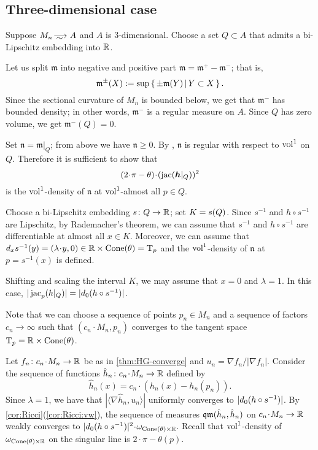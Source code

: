 \subsection{Three-dimensional case}


Suppose $M_n\smooths{}A$ and $A$ is 3-dimensional.
Choose a set $Q\subset A$ that admits a bi-Lipschitz embedding into $\mathbb{R}$. 

Let us split $\mathfrak m$ into negative and positive part $\mathfrak m=\mathfrak m^+-\mathfrak m^-$; that is,
\[\mathfrak m^\pm(X)\mathrel{{:}{=}}\sup\left\{\,\pm\mathfrak m(Y)\,\middle|\,Y\subset X\,\right\}.\]
Since the sectional curvature of $M_n$ is bounded below, we get that $\mathfrak m^-$ has bounded density; in other words, $\mathfrak m^-$ is a regular measure on $A$.
Since $Q$ has zero volume, we get $\mathfrak m^-(Q)=0$.

Set $\mathfrak n=\mathfrak m|_{Q}$; from above we have $\mathfrak n\ge 0$.
By \cite{petrunin-SC}, $\mathfrak n$ is regular with respect to $\operatorname{vol}^1$ on $Q$.
Therefore it is sufficient to show that 
\[(2\cdot\pi-\theta)\cdot (\jac(\bm{h}|_Q))^2\]
is the $\operatorname{vol}^1$-density of $\mathfrak n$
at $\operatorname{vol}^1$-almost all $p\in Q$.

Choose a bi-Lipschitz embedding $s\colon Q\to \mathbb{R}$;
set $K\zz=s(Q)$.
Since $s^{-1}$ and $h\circ s^{-1}$ are Lipschitz, 
by Rademacher's theorem, we can assume that $s^{-1}$ and $h\circ s^{-1}$ are differentiable at almost all $x\in K$.
Moreover, we can assume that $d_xs^{-1}(y)=(\lambda\cdot y,0)\in \RR\times \Cone(\theta)=\T_p$ and the $\operatorname{vol}^1$-density of $\mathfrak n$ at $p=s^{-1}(x)$ is defined.

Shifting and scaling the interval $K$, we may assume that $x=0$ and $\lambda=1$.
In this case, $|\mathop{\rm jac}_p(h|_Q)|=|d_0(h\circ s^{-1})|$.

Note that we can choose a sequence of points $p_n\in M_n$ and a sequence of factors $c_n\to \infty$ such that $(c_n\cdot M_n,p_n)$ converges to the tangent space~$\mathrm{T}_p=\mathbb{R}\times \operatorname{Cone}(\theta)$.

Let $f_n\:c_n\cdot M_n\to \RR$ be as in \ref{thm:HG-converge} and $u_n=\nabla f_n/|\nabla f_n|$.
Consider the sequence of functions $\hat h_n\:c_n\cdot M_n\to \RR$ defined by 
\[\hat h_n(x)=c_n\cdot(h_n(x)-h_n(p_n)).\]
Since $\lambda=1$, we have that $|\langle\nabla \hat h_n,u_n\rangle|$ uniformly converges to $|d_0(h\zz\circ s^{-1})|$.
By \ref{cor:Ricci}(\ref{cor:Ricci:vw}), the sequence of measures $\operatorname{\mathfrak{qm}}(\hat h_n, \hat h_n)$ on $c_n\cdot M_n\to \RR$ weakly converges to $|d_0(h\zz\circ s^{-1})|^2\cdot\omega_{\Cone(\theta)\times\RR}$.
Recall that $\operatorname{vol}^1$-density of $\omega_{\operatorname{Cone}(\theta)\times\mathbb{R}}$ on the singular line is $2\cdot \pi-\theta(p)$.

